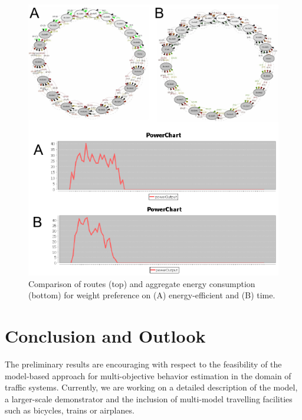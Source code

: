 \documentclass[conference]{../cls/IEEEtran}
\begin{document}
\begin{figure}[t!]
	\includegraphics[width=\columnwidth]{../gfx/results.pdf}
	\caption{Comparison of routes (top) and aggregate energy consumption
	(bottom) for weight preference  on (A) energy-efficient and (B) time.}
	\label{figure:results}
\end{figure}

\section{Conclusion and Outlook}

The preliminary results are encouraging with respect to the feasibility of the model-based approach for multi-objective behavior estimation in the domain of traffic systems. Currently, we are working on a detailed description of the model, a larger-scale demonstrator and the inclusion of multi-model travelling facilities such as bicycles, trains or airplanes.



\end{document}
